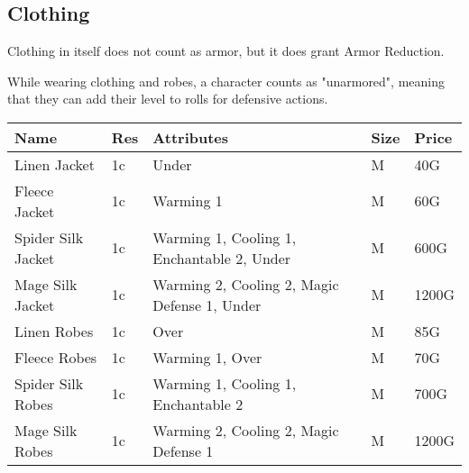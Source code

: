 \subsection{Clothing}\label{subsec:clothing}

Clothing in itself does not count as armor, but it does grant Armor Reduction.

While wearing clothing and robes, a character counts as "unarmored", meaning that they can add their level to rolls for defensive actions.

\begin{longtable}{p{3cm} | p{1.5cm} | p{5cm} | p{1cm} | p{1.5cm}}
	Name & Res &   Attributes & Size & Price\\ \hline
	Linen Jacket & 1c & Under & M & 40G\\
	
	Fleece Jacket & 1c & Warming 1 & M & 60G\\
	
	Spider Silk Jacket & 1c & Warming 1, Cooling 1, Enchantable 2, Under & M & 600G\\
	
	Mage Silk Jacket & 1c & Warming 2, Cooling 2, Magic Defense 1, Under & M & 1200G\\
	
	Linen Robes & 1c & Over & M & 85G\\
	
	Fleece Robes & 1c & Warming 1, Over & M & 70G\\

	Spider Silk Robes & 1c & Warming 1, Cooling 1, Enchantable 2 & M & 700G\\
	
	Mage Silk Robes & 1c & Warming 2, Cooling 2, Magic Defense 1 & M & 1200G\\
\end{longtable}